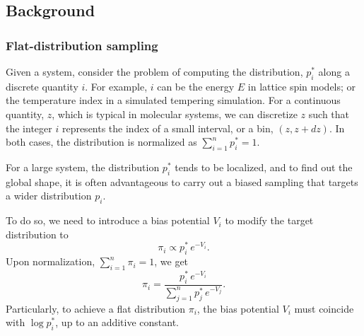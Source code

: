 \documentclass[reprint, floatfix]{revtex4-1}
\begin{document}
\subsection{\label{sec:background}
Background}



\subsubsection{\label{sec:FDS}
Flat-distribution sampling}



Given a system,
consider the problem of computing
the distribution, $p^*_i$
along a discrete quantity $i$.
%
%
For example, $i$ can be the energy $E$
in lattice spin models; or the temperature index
in a simulated tempering simulation.
%
For a continuous quantity, $z$,
which is typical in molecular systems,
we can discretize $z$
such that the integer $i$ represents
the index of a small interval, or a bin,
$(z, z + dz)$.
%
In both cases,
the distribution is normalized as
$\sum_{i = 1}^n p^*_i = 1$.



For a large system,
the distribution $p^*_i$ tends to
be localized,
%
and to find out the global shape,
it is often advantageous to carry out
a biased sampling that targets
a wider distribution $p_i$.
%



To do so, we need to introduce a bias potential $V_i$
to modify the target distribution to
%
\begin{equation}
  \pi_i \propto p^*_i \, e^{-V_i}.
  \label{eq:pi_p_phi1}
\end{equation}
%
Upon normalization, $\sum_{i = 1}^n \pi_i = 1$,
we get
%
\begin{equation}
  \pi_i =
  \frac{ p^*_i \, e^{-V_i} }
  { \sum_{j = 1}^n p^*_j \, e^{-V_j} }.
  \label{eq:pi_p_phi}
\end{equation}
%
Particularly,
to achieve a flat distribution $\pi_i$,
the bias potential $V_i$
must coincide with $\log p^*_i$,
up to an additive constant.
\end{document}
